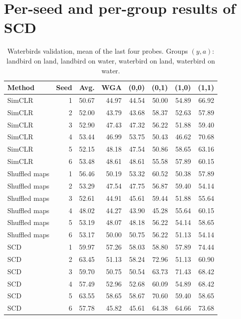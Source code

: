\documentclass[11pt]{article}
\begin{document}
\section{Per-seed and per-group results of SCD}
\label{app:seeds}
\begin{table}[H]
\centering\small
\setlength{\tabcolsep}{4pt}
\caption{Waterbirds validation, mean of the last four probes. Groups $(y,a)$: landbird on land, landbird on water,
waterbird on land, waterbird on water.}
\begin{tabular}{lrrrrrrr}
\toprule
Method & Seed & Avg. & WGA & (0,0) & (0,1) & (1,0) & (1,1) \\
\midrule
SimCLR & 1 & 50.67 & 44.97 & 44.54 & 50.00 & 54.89 & 66.92 \\
SimCLR & 2 & 52.00 & 43.79 & 43.68 & 58.37 & 52.63 & 57.89 \\
SimCLR & 3 & 52.90 & 47.43 & 47.32 & 56.22 & 51.88 & 59.40 \\
SimCLR & 4 & 53.44 & 46.99 & 53.75 & 50.43 & 46.62 & 70.68 \\
SimCLR & 5 & 52.15 & 48.18 & 47.54 & 50.86 & 58.65 & 63.16 \\
SimCLR & 6 & 53.48 & 48.61 & 48.61 & 55.58 & 57.89 & 60.15 \\
\addlinespace
Shuffled maps & 1 & 56.46 & 50.19 & 53.32 & 60.52 & 50.38 & 57.89 \\
Shuffled maps & 2 & 53.29 & 47.54 & 47.75 & 56.87 & 59.40 & 54.14 \\
Shuffled maps & 3 & 52.61 & 44.91 & 45.61 & 59.44 & 51.88 & 55.64 \\
Shuffled maps & 4 & 48.02 & 44.27 & 43.90 & 45.28 & 55.64 & 60.15 \\
Shuffled maps & 5 & 53.19 & 48.07 & 48.18 & 56.22 & 54.14 & 58.65 \\
Shuffled maps & 6 & 53.17 & 50.00 & 50.75 & 56.22 & 51.13 & 54.14 \\
\addlinespace
SCD & 1 & 59.97 & 57.26 & 58.03 & 58.80 & 57.89 & 74.44 \\
SCD & 2 & 63.45 & 51.13 & 58.24 & 72.96 & 51.13 & 60.90 \\
SCD & 3 & 59.70 & 50.75 & 50.54 & 63.73 & 71.43 & 68.42 \\
SCD & 4 & 57.49 & 52.96 & 52.68 & 60.09 & 54.89 & 68.42 \\
SCD & 5 & 63.55 & 58.65 & 58.67 & 70.60 & 59.40 & 58.65 \\
SCD & 6 & 57.78 & 45.82 & 45.61 & 64.38 & 64.66 & 73.68 \\
\bottomrule
\end{tabular}
\end{table}
\end{document}
